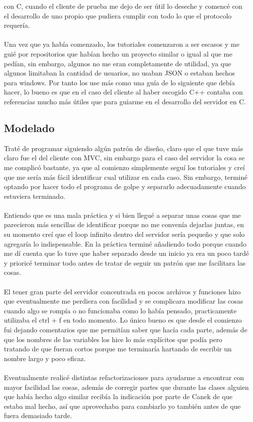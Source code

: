 \documentclass[12pt,a4paper]{article}
\begin{document}
con C, cuando el cliente de prueba me dejo de ser útil lo deseche y comencé con el desarrollo de uno propio que pudiera cumplir con todo 
lo que el protocolo requería.
\\\\
Una vez que ya había comenzado, los tutoriales comenzaron a ser escasos y me guié por repositorios que habían hecho un proyecto similar o 
igual al que me pedían, sin embargo, algunos no me eran completamente de utilidad, ya que algunos limitaban la cantidad de usuarios, no 
usaban JSON o estaban hechos para windows. Por tanto los use más como una guía de lo siguiente que debía hacer, lo bueno es que en el caso del cliente al haber escogido C++ contaba con referencias mucho más útiles que para guiarme en el desarrollo del servidor en C.
\subsection{Modelado}
Traté de programar siguiendo algún patrón de diseño, claro que el que tuve más claro fue el del cliente con MVC, sin embargo para el caso 
del servidor la cosa se me complicó bastante, ya que al comienzo simplemente seguí los tutoriales y creí que me sería más fácil identificar
 cual utilizar en cada caso. Sin embargo, terminé optando por hacer todo el programa de golpe y separarlo adecuadamente cuando estuviera 
 terminado. \\\\
Entiendo que es una mala práctica y si bien llegué a separar unas cosas que me parecieron más sencillas de identificar porque no me 
convenía dejarlas juntas, en su momento creí que el loop infinito dentro del servidor sería pequeño y que solo agregaría lo indispensable. 
En la práctica terminé añadiendo todo porque cuando me dí cuenta que lo tuve que haber separado desde un inicio ya era un poco tardé y 
prioricé terminar todo antes de tratar de seguir un patrón que me facilitara las cosas.\\
\\
El tener gran parte del servidor concentrada en pocos archivos y funciones hizo que eventualmente me perdiera con facilidad y se 
complicara modificar las cosas cuando algo se rompía o no funcionaba como lo había pensado, practicamente utilizaba el ctrl + f en 
todo momento. Lo único bueno es que desde el comienzo fui dejando comentarios que me permitían saber que hacía cada parte, además de 
que los nombres de las variables los hice lo más explícitos que podía pero tratando de que fueran cortos porque me terminaría hartando 
de escribir un nombre largo y poco eficaz.
\\\\
Eventualmente realicé distintas refactorizaciones para ayudarme a encontrar con mayor facilidad las cosas, además de corregir partes
 que durante las clases alguien que había hecho algo similar recibía la indicación por parte de Canek de que estaba mal hecho, así 
 que aprovechaba para cambiarlo yo también antes de que fuera demasiado tarde.\\
\end{document}
